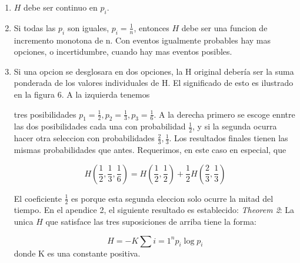 \begin{enumerate}
\item $H$ debe ser continuo en $p_{i}$.
\item Si todas las $p_{i}$ son iguales, $p_{i} = \frac{1}{n}$, entonces $H$ debe ser una funcion de incremento monotona de n. Con eventos igualmente probables hay mas opciones, o incertidumbre, cuando hay mas eventos posibles.
\item Si una opcion se desglosara en dos opciones, la H original deber\'{i}a ser la suma ponderada de los valores individuales de H. El significado de esto es ilustrado en la figura 6. A la izquierda tenemos


tres posibilidades $p_{1} = \frac{1}{2}, p_{2} = \frac{1}{3}, p_{3} = \frac{1}{6}$. A la derecha primero se escoge enntre las dos posibilidades cada una con probabilidad $\frac{1}{2}$, y si la segunda ocurra hacer otra seleccion con probabilidades $\frac{2}{3}, \frac{1}{3}$. Los resultados finales tienen las mismas probabilidades que antes. Requerimos, en este caso en especial, que

\begin{equation}
H(\frac{1}{2},\frac{1}{3},\frac{1}{6}) = H(\frac{1}{2},\frac{1}{2}) + \frac{1}{2}H(\frac{2}{3},\frac{1}{3})
\end{equation}

El coeficiente $\frac{1}{2}$ es porque esta segunda eleccion solo ocurre la mitad del tiempo.
En el apendice 2, el siguiente resultado es establecido:
\textit{Theorem 2}: La unica $H$ que satisface las tres suposiciones de arriba tiene la forma:

\begin{equation}
H = -K \sum{i=1}^{n} p_{i} \log p_{i}
\end{equation}
donde K es una constante positiva.
\end{enumerate}


